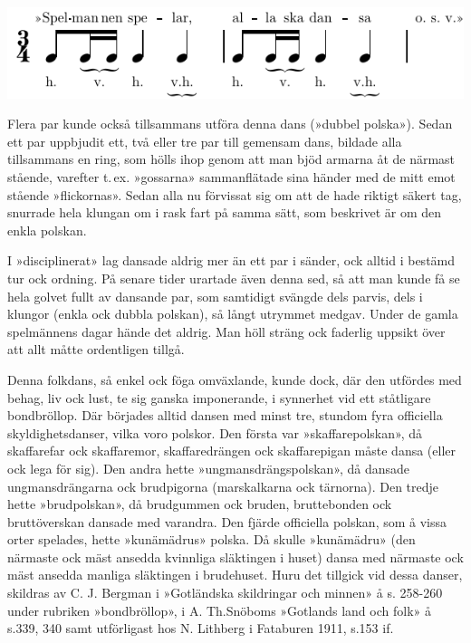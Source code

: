 {\vspace{0.6cm}
\includegraphics{include/snippets/spelmannen-spelar-crop.pdf}
\vspace{0.3cm}

Flera par kunde också tillsammans utföra denna dans (»dubbel polska»). Sedan ett par uppbjudit ett, två eller tre par till gemensam dans, bildade alla tillsammans en ring, som hölls ihop genom att man bjöd armarna åt de närmast stående, varefter t.\,ex. »gossarna» sammanflätade sina händer med de mitt emot stående »flickornas». Sedan alla nu förvissat sig om att de hade riktigt säkert tag, snurrade hela klungan om i rask fart på samma sätt, som beskrivet är om den enkla polskan.

I »disciplinerat» lag dansade aldrig mer än ett par i sänder, ock alltid i bestämd tur ock ordning. På senare tider urartade även denna sed, så att man kunde få se hela golvet fullt av dansande par, som samtidigt svängde dels parvis, dels i klungor (enkla ock dubbla polskan), så långt utrymmet medgav. Under de gamla spelmännens dagar hände det aldrig. Man höll sträng ock faderlig uppsikt över att allt måtte ordentligen tillgå.

Denna folkdans, så enkel ock föga omväxlande, kunde dock, där den utfördes med behag, liv ock lust, te sig ganska imponerande, i synnerhet vid ett ståtligare bondbröllop. Där börjades alltid dansen med minst tre, stundom fyra officiella skyldighetsdanser, vilka voro polskor. Den första var »skaffarepolskan», då skaffarefar ock skaffaremor, skaffaredrängen ock skaffarepigan måste dansa (eller ock lega för sig). Den andra hette »ungmansdrängspolskan», då dansade ungmansdrängarna ock brudpigorna (marskalkarna ock tärnorna). Den tredje hette »brudpolskan», då brudgummen ock bruden, bruttebonden ock bruttöverskan dansade med varandra. Den fjärde officiella polskan, som å vissa orter spelades, hette »kunämädrus» polska. Då skulle »kunämädru» (den närmaste ock mäst ansedda
kvinnliga släktingen i huset) dansa med närmaste ock mäst ansedda manliga släktingen i brudehuset. Huru det tillgick vid dessa danser, skildras av C. J. Bergman i »Gotländska skildringar och minnen» å s. 258-260 under rubriken »bondbröllop», i A. Th.\@ Snöboms »Gotlands land och folk» å s.\@ 339, 340 samt utförligast hos N. Lithberg i Fataburen 1911, s.\@ 153 if.

}

